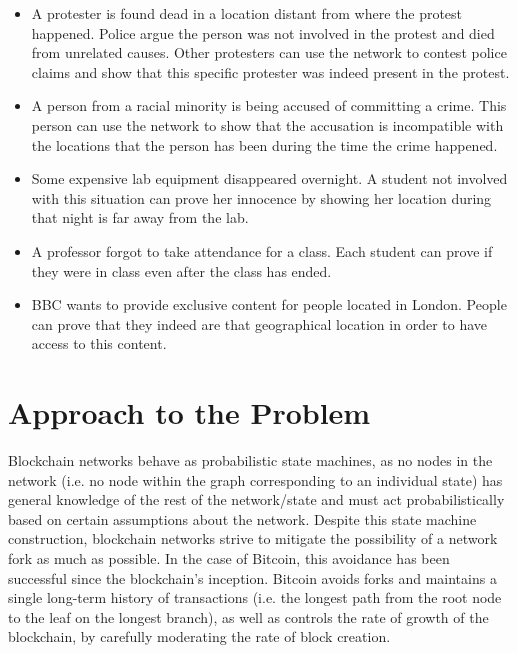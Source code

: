 \documentclass{article}
\begin{document}
\begin{itemize}
	\item A protester is found dead in a location distant from where the protest happened.
		Police argue the person was not involved in the protest
		and died from unrelated causes.
		Other protesters can use the network to contest police claims
		and show that this specific protester was indeed present in the protest.

	\item A person from a racial minority is being accused of committing a crime.
		This person can use the network to show that the accusation
		is incompatible with the locations that the person has been
		during the time the crime happened.

	\item Some expensive lab equipment disappeared overnight.
		A student not involved with this situation
		can prove her innocence by showing her location during that night
		is far away from the lab.

	\item A professor forgot to take attendance for a class.
		Each student can prove if they were in class
		even after the class has ended.

	\item BBC wants to provide exclusive content for people located in London.
		People can prove that they indeed are that geographical location
		in order to have access to this content.
\end{itemize}


\section*{Approach to the Problem}
Blockchain networks behave as probabilistic state machines, as no nodes in the
network (i.e. no node within the graph corresponding to an individual state) has
general knowledge of the rest of the network/state and must act probabilistically
based on certain assumptions about the network\cite{saito_2016}. Despite this
state machine construction, blockchain networks strive to mitigate the
possibility of a network fork as much as possible. In the case of Bitcoin, this
avoidance has been successful since the blockchain's inception\cite{decker_2013}.
Bitcoin avoids forks and maintains a single long-term history of transactions
(i.e. the longest path from the root node to the leaf on the longest branch), as
well as controls the rate of growth of the blockchain, by carefully moderating
the rate of block creation.
\end{document}
